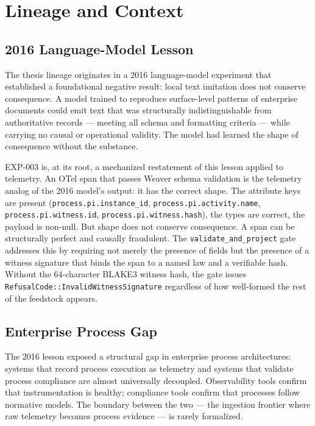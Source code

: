 
\section{Lineage and Context}
\label{sec:otel-weaver-exp-003-live-check-to-refusal-lineage}

\subsection{2016 Language-Model Lesson}
\label{sec:otel-weaver-exp-003-live-check-to-refusal-lineage-lm}

The thesis lineage originates in a 2016 language-model experiment that established a
foundational negative result: local text imitation does not conserve consequence.
A model trained to reproduce surface-level patterns of enterprise documents could emit
text that was structurally indistinguishable from authoritative records --- meeting
all schema and formatting criteria --- while carrying no causal or operational validity.
The model had learned the shape of consequence without the substance.

EXP-003 is, at its root, a mechanized restatement of this lesson applied to telemetry.
An OTel span that passes Weaver schema validation is the telemetry analog of the 2016
model's output: it has the correct shape. The attribute keys are present
(\texttt{process.pi.instance\_id}, \texttt{process.pi.activity.name},
\texttt{process.pi.witness.id}, \texttt{process.pi.witness.hash}), the types are
correct, the payload is non-null. But shape does not conserve consequence. A span
can be structurally perfect and causally fraudulent. The \texttt{validate\_and\_project}
gate addresses this by requiring not merely the presence of fields but the presence
of a witness signature that binds the span to a named law and a verifiable hash.
Without the 64-character BLAKE3 witness hash, the gate issues \texttt{RefusalCode::InvalidWitnessSignature}
regardless of how well-formed the rest of the feedstock appears.

\subsection{Enterprise Process Gap}
\label{sec:otel-weaver-exp-003-live-check-to-refusal-lineage-gap}

The 2016 lesson exposed a structural gap in enterprise process architectures: systems
that record process execution as telemetry and systems that validate process compliance
are almost universally decoupled. Observability tools confirm that instrumentation
is healthy; compliance tools confirm that processes follow normative models. The
boundary between the two --- the ingestion frontier where raw telemetry becomes
process evidence --- is rarely formalized.

